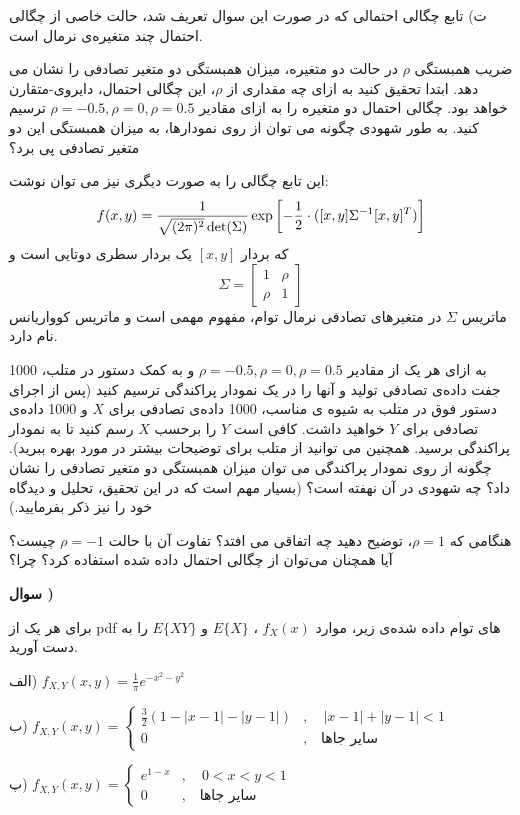 \documentclass[10pt,letterpaper]{report}
\newcounter{questionnumber}
\newcommand{\Q}{
\textbf{سوال \thequestionnumber)}
\stepcounter{questionnumber}
}
\begin{document}
ت) تابع چگالی احتمالی که در صورت این سوال تعریف شد، حالت خاصی از چگالی احتمال چند متغیره‌ی نرمال است.

ضریب همبستگی $\rho$ در حالت دو متغیره، میزان همبستگی دو متغیر تصادفی را نشان می دهد. ابتدا تحقیق کنید به ازای چه مقداری از $\rho$، این چگالی احتمال، دایروی-متقارن خواهد بود. چگالی احتمال دو متغیره را به ازای مقادیر 
$\rho=-0.5,\rho=0,\rho=0.5$
 ترسیم کنید. به طور شهودی چگونه می توان از روی نمودارها، به میزان همبستگی این دو متغیر تصادفی پی برد؟

این تابع چگالی را به صورت دیگری نیز می توان نوشت:
$$
f(x,y)={1\over \sqrt{(2\pi)^2}\det(\Sigma)}\exp\left[-{1\over 2}\cdot([x,y]\Sigma^{-1}[x,y]^T)\right]
$$
که بردار $[x,y]$ یک بردار سطری دوتایی است و 
$$
\Sigma=\begin{bmatrix}
1&\rho\\
\rho&1
\end{bmatrix}
$$
ماتریس $\Sigma$ در متغیرهای تصادفی نرمال توام، مفهوم مهمی است و ماتریس کوواریانس نام دارد.

به ازای هر یک از مقادیر 
$\rho=-0.5,\rho=0,\rho=0.5$
 و به کمک دستور 
 در متلب، 1000 جفت داده‌ی تصادفی تولید و آنها را در یک نمودار پراکندگی ترسیم کنید (پس از اجرای دستور فوق در متلب به شیوه ی مناسب، 1000 داده‌ی تصادفی برای $X$ و 1000 داده‌ی تصادفی برای $Y$ خواهید داشت. کافی است $Y$ را برحسب $X$ رسم کنید تا به نمودار پراکندگی برسید. همچنین می توانید از  متلب برای توضیحات بیشتر در مورد  بهره ببرید). چگونه از روی نمودار پراکندگی می توان میزان همبستگی دو متغیر تصادفی را نشان داد؟ چه شهودی در آن نهفته است؟ (بسیار مهم است که در این تحقیق، تحلیل و دیدگاه خود را نیز ذکر بفرمایید.)

هنگامی که $\rho=1$، توضیح دهید چه اتفاقی می افتد؟ تفاوت آن با حالت $\rho=-1$ چیست؟ آیا همچنان می‌توان از چگالی احتمال داده شده استفاده کرد؟ چرا؟

\Q
برای هر یک از pdf های توام داده شده‌ی زیر، موارد 
$
f_X(x)
$
،
$
E\{X\}
$
و
$
E\{XY\}
$
را به دست آورید.

الف) 
$
f_{X,Y}(x,y)=\frac{1}{\pi}e^{-x^2-y^2}
$

ب) 
$
f_{X,Y}(x,y)=\begin{cases}
\frac{3}{2}(1-|x-1|-|y-1|)&,\quad |x-1|+|y-1|<1\\
0&,\quad \text{سایر جاها}
\end{cases}
$

پ)
$
f_{X,Y}(x,y)=\begin{cases}
e^{1-x}&,\quad 0<x<y<1\\
0&,\quad \text{سایر جاها}
\end{cases}
$
\end{document}
